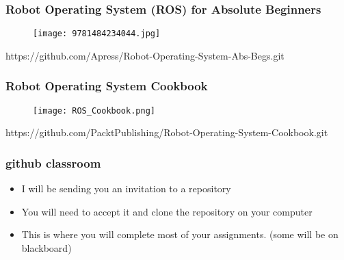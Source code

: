 \documentclass[12pt,letterpaper]{beamer}
\begin{document}
\begin{frame}
	\frametitle{Robot Operating System (ROS) for Absolute Beginners}
	\begin{figure}[htbp]
   		\centering
   		\texttt{[image: 9781484234044.jpg]} 
	\end{figure}
	https://github.com/Apress/Robot-Operating-System-Abs-Begs.git
\end{frame}

\begin{frame}
	\frametitle{Robot Operating System Cookbook}
	\begin{figure}[htbp]
   		\centering
   		\texttt{[image: ROS\_Cookbook.png]} 
	\end{figure}
	https://github.com/PacktPublishing/Robot-Operating-System-Cookbook.git
\end{frame}

\begin{frame}
	\frametitle{github classroom}
	\begin{itemize}
		\item<1-> I will be sending you an invitation to a repository
		\item<2-> You will need to accept it and clone the repository on your computer
		\item<3-> This is where you will complete most of your assignments. (some will be on blackboard)
	\end{itemize}
\end{frame}
\end{document}
